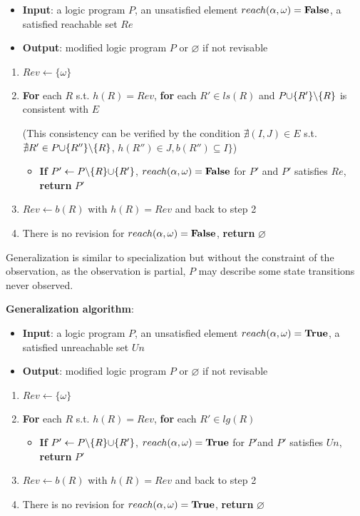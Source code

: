     \begin{itemize}
        \item \textbf{Input}: a logic program $P$, an unsatisfied element $reach(\alpha,\omega)=\mathbf{False}$, a satisfied reachable set $Re$%
        \item \textbf{Output}: modified logic program $P$ or $\varnothing$ if not revisable
    \end{itemize}
    \begin{enumerate}
        \item $Rev\gets\{\omega\}$
        \item \textbf{For} each $R$ s.t. $h(R)=Rev$, \textbf{for} each $R'\in ls(R)$ and $P\addset{R'}\miset{R}$ is consistent with $E$
        
        (This consistency can be verified by the condition $\nexists (I,J)\in E$ s.t. $\nexists R'\in P\addset{R''}\miset{R}$, $h(R'')\in J, b(R'')\subseteq I\}$)
        \begin{itemize}
            \item \textbf{If} $P' \gets P \miset{R} \addset{R'}$, $reach(\alpha,\omega)=\mathbf{False}$ for $P'$ and $P'$ satisfies $Re$, \textbf{return} $P'$
        \end{itemize}
        \item $Rev\gets b(R)$ with $h(R)=Rev$ and back to step 2
        \item There is no revision for $reach(\alpha,\omega)=\mathbf{False}$, \textbf{return} $\varnothing$
    \end{enumerate}
    
     Generalization is similar to specialization but without the constraint of the observation, as the observation is partial, $P$ may describe some state transitions never observed.
     
    \textbf{Generalization algorithm}:
    
    \begin{itemize}
        \item \textbf{Input}: a logic program $P$, an unsatisfied element $reach(\alpha,\omega)=\mathbf{True}$, a satisfied unreachable set $Un$
        \item \textbf{Output}: modified logic program $P$ or $\varnothing$ if not revisable
    \end{itemize}
    \begin{enumerate}
        \item $Rev\gets\{\omega\}$
        \item \textbf{For} each $R$ s.t. $h(R)=Rev$, \textbf{for} each $R'\in lg(R)$
        \begin{itemize}
            \item \textbf{If} $P' \gets P \miset{R} \addset{R'}$, $reach(\alpha,\omega)=\mathbf{True}$ for $P'$and $P'$ satisfies $Un$, \textbf{return} $P'$
        \end{itemize}
        \item $Rev\gets b(R)$ with $h(R)=Rev$ and back to step 2
        \item There is no revision for $reach(\alpha,\omega)=\mathbf{True}$, \textbf{return} $\varnothing$
    \end{enumerate}
    
